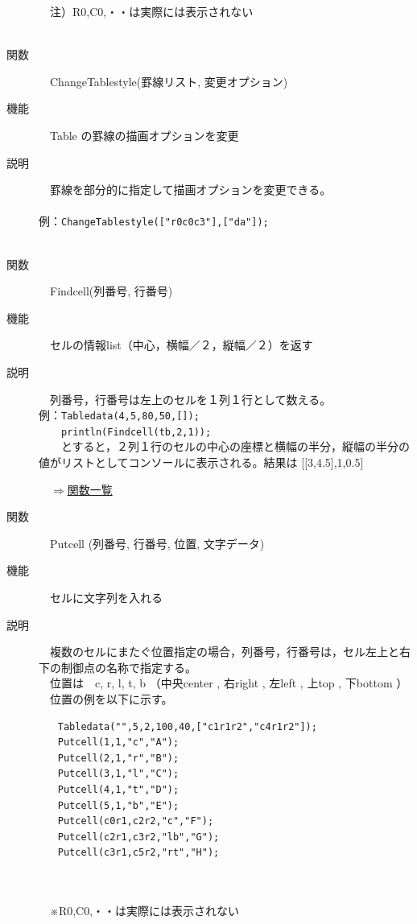 \documentclass[papersize,a4paper,12pt,uplatex]{jsarticle}
\begin{document}
\begin{description}
　注）R0,C0,・・は実際には表示されない\\
　\\
\hypertarget{changetablestyle}{}
\item[関数]　ChangeTablestyle(罫線リスト, 変更オプション)
\item[機能]　Table の罫線の描画オプションを変更
\item[説明]　罫線を部分的に指定して描画オプションを変更できる。\\
　\\
例：\verb|ChangeTablestyle(["r0c0c3"],["da"]);| 
　\\
　\\
\hypertarget{findcell}{}
\item[関数]　Findcell(列番号, 行番号)
\item[機能]　セルの情報list（中心，横幅／２，縦幅／２）を返す
\item[説明]　列番号，行番号は左上のセルを１列１行として数える。　\\

例：\verb|Tabledata(4,5,80,50,[]);|\\
　　\verb|println(Findcell(tb,2,1));|\\
　　とすると，２列１行のセルの中心の座標と横幅の半分，縦幅の半分の値がリストとしてコンソールに表示される。結果は [[3,4.5],1,0.5]\\ 

\begin{flushright}　\hyperlink{functionlist}{$\Rightarrow$関数一覧}\end{flushright}

\hypertarget{putcell}{}
\item[関数]　Putcell (列番号, 行番号, 位置, 文字データ)
\item[機能]　セルに文字列を入れる
\item[説明]　複数のセルにまたぐ位置指定の場合，列番号，行番号は，セル左上と右下の制御点の名称で指定する。\\
　位置は　c, r, l, t, b （中央center , 右right , 左left , 上top , 下bottom   ）\\
　位置の例を以下に示す。
\begin{verbatim}
　　Tabledata("",5,2,100,40,["c1r1r2","c4r1r2"]);
　　Putcell(1,1,"c","A");
　　Putcell(2,1,"r","B");
　　Putcell(3,1,"l","C");
　　Putcell(4,1,"t","D");
　　Putcell(5,1,"b","E");
　　Putcell(c0r1,c2r2,"c","F");
　　Putcell(c2r1,c3r2,"lb","G");
　　Putcell(c3r1,c5r2,"rt","H");
\end{verbatim}
　\\
　　　\\
　※R0,C0,・・は実際には表示されない\\


\end{description}
\end{document}
